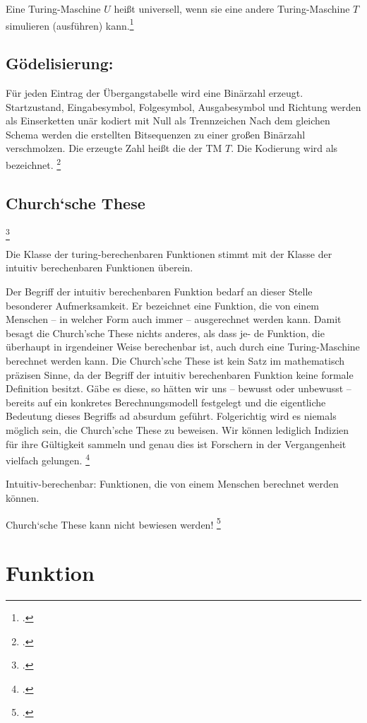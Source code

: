 \documentclass{lehramt-informatik-haupt}
\begin{document}
Eine Turing-Maschine $U$ heißt universell, wenn sie eine andere
Turing-Maschine $T$ simulieren (ausführen) kann.\footcite[Seite
23]{theo:fs:4}

\subsection{Gödelisierung:}

Für jeden Eintrag der Übergangstabelle wird eine Binärzahl erzeugt.
Startzustand, Eingabesymbol, Folgesymbol, Ausgabesymbol und Richtung
werden als Einserketten unär kodiert mit Null als Trennzeichen Nach dem
gleichen Schema werden die erstellten Bitsequenzen zu einer großen
Binärzahl verschmolzen. Die erzeugte Zahl heißt die 
der TM $T$. Die Kodierung wird als  bezeichnet.
\footcite[Seite 23]{theo:fs:4}

\subsection{Church‘sche These}
\footcite{wiki:church-these}

Die Klasse der turing-berechenbaren Funktionen stimmt mit der
Klasse der intuitiv berechenbaren Funktionen überein.

Der Begriff der intuitiv berechenbaren Funktion bedarf an dieser Stelle
besonderer Aufmerksamkeit. Er bezeichnet eine Funktion, die von einem
Menschen – in welcher Form auch immer – ausgerechnet werden kann. Damit
besagt die Church’sche These nichts anderes, als dass je- de Funktion,
die überhaupt in irgendeiner Weise berechenbar ist, auch durch eine
Turing-Maschine berechnet werden kann. Die Church’sche These ist kein
Satz im mathematisch präzisen Sinne, da der Begriff der intuitiv
berechenbaren Funktion keine formale Definition besitzt. Gäbe es
diese, so hätten wir uns – bewusst oder unbewusst – bereits auf ein
konkretes Berechnungsmodell festgelegt und die eigentliche Bedeutung
dieses Begriffs ad absurdum geführt. Folgerichtig wird es niemals
möglich sein, die Church’sche These zu beweisen. Wir können lediglich
Indizien für ihre Gültigkeit sammeln und genau dies ist Forschern in der
Vergangenheit vielfach gelungen.
\footcite[Seite 308]{hoffmann}

Intuitiv-berechenbar:
Funktionen, die von einem Menschen berechnet werden können.

Church‘sche These kann nicht bewiesen werden!
\footcite[Seite 27]{theo:fs:4}

\section{Funktion}
\end{document}
